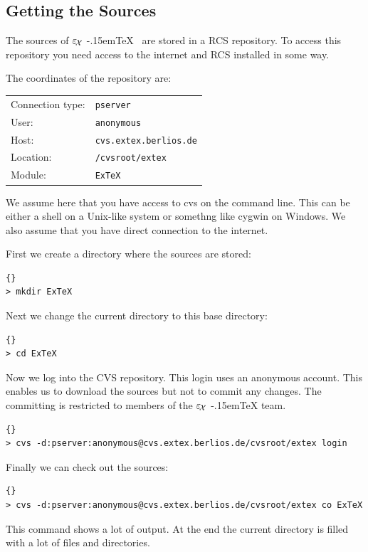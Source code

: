 \documentclass[12pt,div12,a4paper]{scrbook}
\providecommand*{\ExTeX}{\ifx\texorpdfstring\undefined
  \textrm{%
    \ensuremath{\textstyle\varepsilon_{\kern-0.15em\mathcal{X}}}%
    \kern-.15em\TeX}%
  \else\texorpdfstring{%
  \textrm{%
    \ensuremath{\textstyle\varepsilon_{\kern-0.15em\mathcal{X}}}%
    \kern-.15em\TeX
  }}{ExTeX}%
  \fi
}
\begin{document}
\subsection{Getting the Sources}

The sources of \ExTeX\ are stored in a RCS repository. To access this
repository you need access to the internet and RCS installed in some
way.

The coordinates of the repository are:
\medskip

\begin{tabular}{ll}\toprule
  Connection type: & \texttt{pserver}			\\
  User:		   & \texttt{anonymous}			\\
  Host:		   & \texttt{cvs.extex.berlios.de}	\\
  Location:	   & \texttt{/cvsroot/extex}		\\
  Module:	   & \texttt{ExTeX}			\\\bottomrule
\end{tabular}
\bigskip

We assume here that you have access to cvs on the command line. This
can be either a shell on a Unix-like system or somethng like cygwin on
Windows. We also assume that you have direct connection to the internet.

First we create a directory where the sources are stored:
\begin{lstlisting}{}
> mkdir ExTeX
\end{lstlisting}

Next we change the current directory to this base directory:
\begin{lstlisting}{}
> cd ExTeX
\end{lstlisting}

Now we log into the CVS repository. This login uses an anonymous
account. This enables us to download the sources but not to commit any
changes. The committing is restricted to members of the \ExTeX{} team.
\begin{lstlisting}{}
> cvs -d:pserver:anonymous@cvs.extex.berlios.de/cvsroot/extex login
\end{lstlisting}

Finally we can check out the sources:
\begin{lstlisting}{}
> cvs -d:pserver:anonymous@cvs.extex.berlios.de/cvsroot/extex co ExTeX
\end{lstlisting}

This command shows a lot of output. At the end the current directory
is filled with a lot of files and directories.
\end{document}
